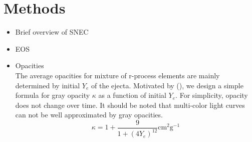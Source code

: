 \documentclass[fleqn,usenatbib]{mnras}
\begin{document}
\section{Methods}
\begin{itemize}
    \item Brief overview of SNEC\\
    \item EOS\\
    \item Opacities\\
    The average opacities for mixture of r-process elements are mainly determined by initial $Y_e$ of the ejecta. Motivated by (\cite{tanaka2018properties}), we design a simple formula for gray opacity $\kappa$ as a function of initial $Y_e$. For simplicity, opacity does not change over time. It should be noted that multi-color light curves can not be well approximated by gray opacities.
    \begin{equation}
    	\label{opacity_ye}
    	\kappa = 1 + \frac{9}{1+(4Y_e)^{12}} \mathrm{ cm^2 g^{-1}}
    \end{equation}
    
    
    

\end{itemize}
\end{document}
